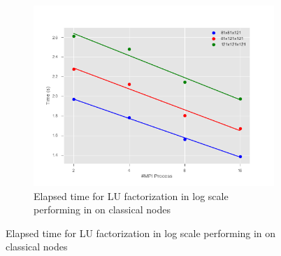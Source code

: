 \begin{figure}
  \begin{subfigure}[b]{0.7\textwidth}
    \includegraphics[width=\textwidth]{images/TimeMPIlog1.png}
    \caption{Elapsed time for LU factorization in log scale performing in on classical nodes}
    \label{TimeMPIlog}
  \end{subfigure}
  
\end{figure}
 
